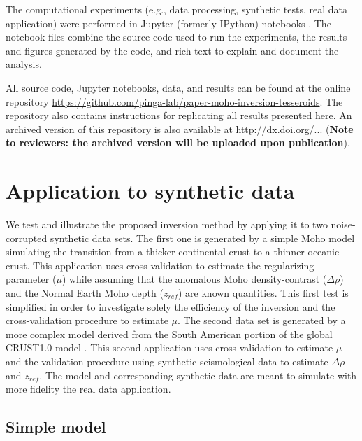 \documentclass[extra,mreferee]{gji}
\begin{document}
The computational experiments
(e.g., data processing, synthetic tests, real data application)
were performed in
Jupyter (formerly IPython) notebooks
\citep[][ \url{http://jupyter.org/}]{perez2007}.
The notebook files combine the source code used to run the experiments,
the results and figures generated by the code,
and rich text to explain and document the analysis.

All source code, Jupyter notebooks, data, and results
can be found at the online repository
\url{https://github.com/pinga-lab/paper-moho-inversion-tesseroids}.
The repository also contains instructions for replicating all results presented
here.
An archived version of this repository is also available at
\url{http://dx.doi.org/...}
(\textbf{Note to reviewers: the archived version will be uploaded upon
publication}).


\section{Application to synthetic data}

We test and illustrate the proposed inversion method
by applying it to two noise-corrupted synthetic data sets.
The first one is generated by a simple Moho model simulating the transition
from a thicker continental crust to a thinner oceanic crust.
This application uses cross-validation to estimate the regularizing parameter
($\mu$) while assuming that the anomalous Moho density-contrast ($\Delta\rho$)
and the Normal Earth Moho depth ($z_{ref}$) are known quantities.
This first test is simplified in order to investigate solely
the efficiency of the inversion and
the cross-validation procedure to estimate $\mu$.
The second data set is generated by a more complex model derived from
the South American portion of the global CRUST1.0 model \citep{laske2013}.
This second application uses cross-validation to estimate $\mu$ and
the validation procedure using synthetic seismological data
to estimate $\Delta\rho$ and $z_{ref}$.
The model and corresponding synthetic data are meant to simulate
with more fidelity the real data application.


\subsection{Simple model}\label{sec:simple-synthetic}
\end{document}
